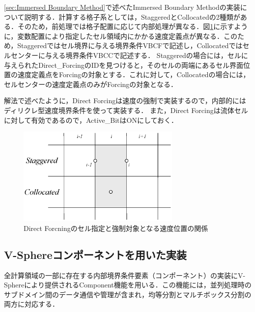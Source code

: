 \ref{sec:Immersed Boundary Method}で述べたImmersed Boundary Methodの実装について説明する．計算する格子系としては，StaggeredとCollocatedの2種類がある．そのため，前処理では格子配置に応じて内部処理が異なる．図\ref{fig:IBmask}に示すように，変数配置により指定したセル領域内にかかる速度定義点が異なる．このため，Staggeredではセル境界に与える境界条件VBCFで記述し，Collocatedではセルセンターに与える境界条件VBCCで記述する．
Staggeredの場合には，セルに与えられたDirect\_ForcingのIDを見つけると，そのセルの両端にあるセル界面位置の速度定義点をForcingの対象とする．これに対して，Collocatedの場合には，セルセンターの速度定義点のみがForcingの対象となる．

解法で述べたように，Direct Forcingは速度の強制で実装するので，内部的にはディリクレ型速度境界条件を使って実装する．
また，Direct Forcingは流体セルに対して有効であるので，Active\_BitはONにしておく．

\begin{figure}[htbp]
\begin{center}
\includegraphics[width=8cm,clip]{IB_mask.eps}
\caption{Direct Forcningのセル指定と強制対象となる速度位置の関係}
\label{fig:IBmask}
\end{center}
\end{figure}


%
\subsection{V-Sphereコンポーネントを用いた実装}
全計算領域の一部に存在する内部境界条件要素（コンポーネント）の実装にV-Sphereにより提供されるComponent機能を用いる．この機能には，並列処理時のサブドメイン間のデータ通信や管理が含まれ，均等分割とマルチボックス分割の両方に対応する．

